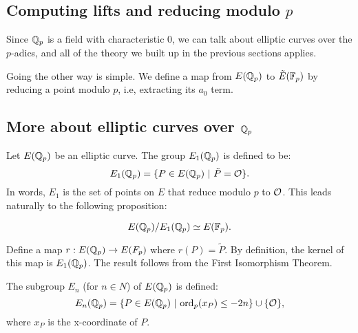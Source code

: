 \subsection{Computing lifts and reducing modulo $p$}
Since $\mathbb{Q}_p$ is a field with characteristic 0, we can talk about elliptic curves over the $p$-adics, and all of the
theory we built up in the previous sections applies.


Going the other way is simple. We define a map from $E(\mathbb{Q}_p)$ to $\tilde{E}(\mathbb{F}_p)$
by reducing a point modulo $p$, i.e, extracting its $a_0$ term.

\subsection{More about elliptic curves over $\mathbb{Q}_p$}

\begin{defn}
Let $E(\mathbb{Q}_p)$ be an elliptic curve. The group $E_1(\mathbb{Q}_p)$ is defined to be:
$$ E_1(\Q_p) = \{ P \in E(\Q_p) \ | \ \tilde{P} = \OO  \}. $$
In words, $E_1$ is the set of points on $E$ that reduce modulo $p$ to $\mathcal{O}$.
This leads naturally to the following proposition:
\end{defn}

\begin{prop}
$$E(\mathbb{Q}_p) / E_1(\mathbb{Q}_p) \simeq E(\mathbb{F}_p).$$
\end{prop}

\begin{pf}
Define a map $r: E(\mathbb{Q}_p) \to E(F_p)$ where $r(P) = \tilde{P}$.  By definition,
the kernel of this map is $E_1(\mathbb{Q}_p)$. The result follows from the First Isomorphism Theorem.
\end{pf}

\begin{defn}
The subgroup $E_n$ (for $n \in N$) of $E(\mathbb{Q}_p)$  is defined:
$$ E_n(\Q_p) = \{ P \in E(\Q_p) \ | \ \mathrm{ord}_p(x_P) \le -2n \} \cup \{ \OO \}, $$
where $x_P$ is the x-coordinate of $P$.
\end{defn}



